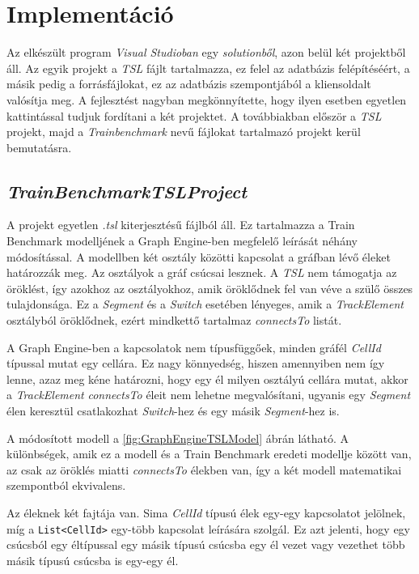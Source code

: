 \chapter{Implementáció}

Az elkészült program \emph{Visual Studioban} egy \emph{solutionből}, azon belül két projektből áll. Az egyik projekt a \emph{TSL} fájlt tartalmazza, ez felel az adatbázis felépítéséért, a másik pedig a \Csh{} forrásfájlokat, ez az adatbázis szempontjából a kliensoldalt valósítja meg. A fejlesztést nagyban megkönnyítette, hogy ilyen esetben egyetlen kattintással tudjuk fordítani a két projektet. A továbbiakban először a \emph{TSL} projekt, majd a \emph{Trainbenchmark} nevű \Csh{} fájlokat tartalmazó projekt kerül bemutatásra.

\section{\emph{TrainBenchmarkTSLProject}}

A projekt egyetlen \emph{.tsl} kiterjesztésű fájlból áll. Ez tartalmazza a Train Benchmark modelljének a Graph Engine-ben megfelelő leírását néhány módosítással. A modellben két osztály közötti kapcsolat a gráfban lévő éleket határozzák meg. Az osztályok a gráf csúcsai lesznek. A \emph{TSL} nem támogatja az öröklést, így azokhoz az osztályokhoz, amik öröklődnek fel van véve a szülő összes tulajdonsága. Ez a \emph{Segment} és a \emph{Switch} esetében lényeges, amik a \emph{TrackElement} osztályból öröklődnek, ezért mindkettő tartalmaz \emph{connectsTo} listát.

A Graph Engine-ben a kapcsolatok nem típusfüggőek, minden gráfél \emph{CellId} típussal mutat egy cellára. Ez nagy könnyedség, hiszen amennyiben nem így lenne, azaz meg kéne határozni, hogy egy él milyen osztályú cellára mutat, akkor a \emph{TrackElement} \emph{connectsTo} éleit nem lehetne megvalósítani, ugyanis egy \emph{Segment} élen keresztül csatlakozhat \emph{Switch}-hez és egy másik \emph{Segment}-hez is.

A módosított modell a \ref{fig:GraphEngineTSLModel} ábrán látható. A különbségek, amik ez a modell és a Train Benchmark eredeti modellje között van, az csak az öröklés miatti \emph{connectsTo} élekben van, így a két modell matematikai szempontból ekvivalens.

Az éleknek két fajtája van. Sima \emph{CellId} típusú élek egy-egy kapcsolatot jelölnek, míg a \texttt{List<CellId>} egy-több kapcsolat leírására szolgál. Ez azt jelenti, hogy egy csúcsból egy éltípussal egy másik típusú csúcsba egy él vezet vagy vezethet több másik típusú csúcsba is egy-egy él.

